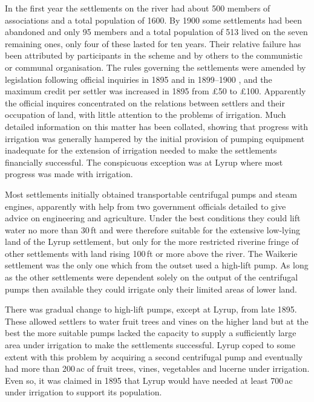 In the first year the settlements on the river had about 500 members
of associations and a total population of 1600.  By 1900 some
settlements had been abandoned and only 95 members and a total
population of 513 lived on the seven remaining ones, only four of
these lasted for ten years.  Their relative failure has been
attributed by participants in the scheme and by others to the
communistic or communal organisation.  The rules governing the
settlements were amended by legislation following official inquiries
in 1895 and in 1899--1900 , and the maximum credit per settler was
increased in 1895 from \pounds50 to \pounds100.  Apparently the
official inquires concentrated on the relations between settlers and
their occupation of land, with little attention to the problems of
irrigation.  Much detailed information on this matter has been
collated, showing that progress with irrigation was generally hampered
by the initial provision of pumping equipment inadequate for the
extension of irrigation needed to make the settlements financially
successful.  The conspicuous exception was at Lyrup where most
progress was made with irrigation.

Most settlements initially obtained transportable centrifugal pumps
and steam engines, apparently with help from two government officials
detailed to give advice on engineering and agriculture.  Under the
best conditions they could lift water no more than 30\,ft and were
therefore suitable for the extensive low-lying land of the Lyrup
settlement, but only for the more restricted riverine fringe of other
settlements with land rising 100\,ft or more above the river.  The
Waikerie settlement was the only one which from the outset used a
high-lift pump.  As long as the other settlements were dependent
solely on the output of the centrifugal pumps then available they
could irrigate only their limited areas of lower land.

There was gradual change to high-lift pumps, except at Lyrup, from
late 1895.  These allowed settlers to water fruit trees and vines on
the higher land but at the best the more suitable pumps lacked the
capacity to supply a sufficiently large area under irrigation to make
the settlements successful.  Lyrup coped to some extent with this
problem by acquiring a second centrifugal pump and eventually had more
than 200\,ac of fruit trees, vines, vegetables and lucerne under
irrigation.  Even so, it was claimed in 1895 that Lyrup would have
needed at least 700\,ac under irrigation to support its
population.

